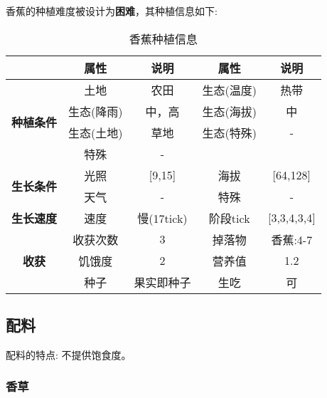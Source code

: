 香蕉的种植难度被设计为\textbf{困难}，其种植信息如下:

\begin{table}[H]
    \centering
    \caption{香蕉种植信息}
    \label{table:香蕉种植信息}
    \setlength{\tabcolsep}{4mm}
    \begin{tabular}{c|cc|cc}
        \toprule
                                           & \textbf{属性} & \textbf{说明} & \textbf{属性} & \textbf{说明} \\
        \midrule
        \multirow{4}{*}{\textbf{种植条件}} & 土地          & 农田          & 生态(温度)    & 热带          \\
                                           & 生态(降雨)    & 中，高        & 生态(海拔)    & 中            \\
                                           & 生态(土地)    & 草地          & 生态(特殊)    & -             \\
                                           & 特殊          & -                                             \\
        \midrule
        \multirow{2}{*}{\textbf{生长条件}} & 光照          & [9,15]        & 海拔          & [64,128]      \\
                                           & 天气          & -             & 特殊          & -             \\
        \midrule
        \textbf{生长速度}                  & 速度          & 慢(17tick)    & 阶段tick      & [3,3,4,3,4]   \\
        \midrule
        \multirow{3}{*}{\textbf{收获}}     & 收获次数      & 3             & 掉落物        & 香蕉:4-7      \\
                                           & 饥饿度        & 2             & 营养值        & 1.2           \\
                                           & 种子          & 果实即种子    & 生吃          & 可            \\
        \bottomrule
    \end{tabular}
\end{table}

\subsection{配料}

配料的特点: 不提供饱食度。

\subsubsection{香草}

